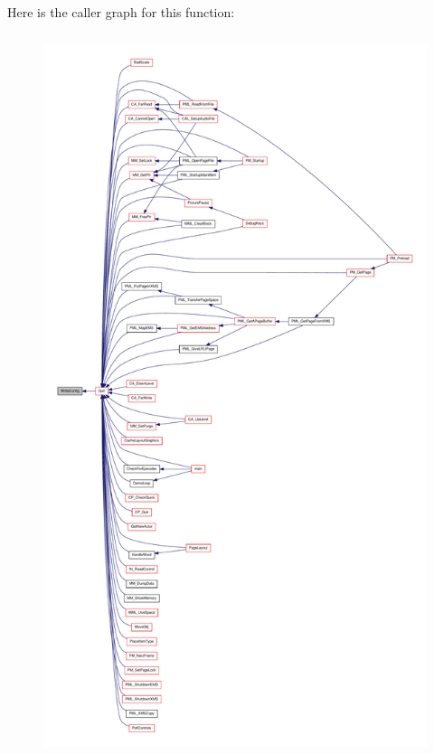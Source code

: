 Here is the caller graph for this function:
\nopagebreak
\begin{figure}[H]
\begin{center}
\leavevmode
\includegraphics[height=600pt]{WL__MAIN_8C_ab82705424ddc91b0a7d3c5fa8420640d_icgraph}
\end{center}
\end{figure}




